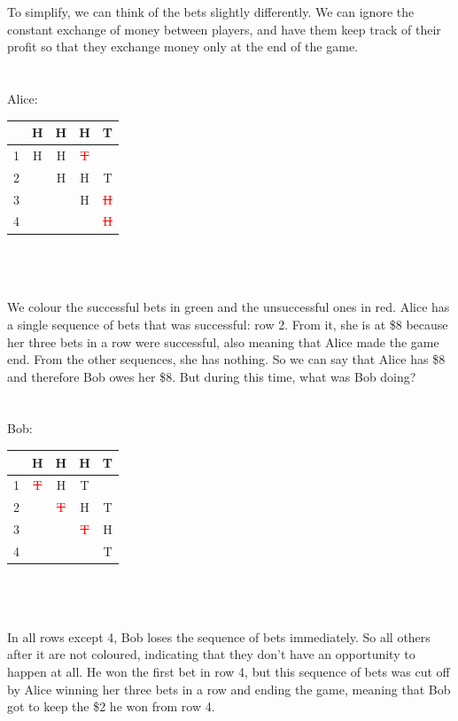 \documentclass[english,12pt,a4paper,final]{article}
\begin{document}
To simplify, we can think of the bets slightly differently. We can ignore the constant exchange of money between players, and have them keep track of their profit so that they exchange money only at the end of the game.
\\\\\\
Alice:
\begin{tabular}{|c|c|c|c|c|}
	\hline
	& H & H & H & T \\
	\hline
	1 & \textcolor{OliveGreen}{H} & \textcolor{OliveGreen}{H} & \textcolor{red}{\sout{T}} &  \\
	\hline
	2 &  & \textcolor{OliveGreen}{H} & \textcolor{OliveGreen}{H} & \textcolor{OliveGreen}{T} \\
	\hline
	3 &  &  & \textcolor{OliveGreen}{H} & \textcolor{red}{\sout{H}} \\
	\hline
	4 &  &  &  & \textcolor{red}{\sout{H}} \\
	\hline
\end{tabular}
\\\\\\
We colour the successful bets in green and the unsuccessful ones in red. Alice has a single sequence of bets that was successful: row 2. From it, she is at \$8 because her three bets in a row were successful, also meaning that Alice made the game end. From the other sequences, she has nothing. So we can say that Alice has \$8 and therefore Bob owes her \$8. But during this time, what was Bob doing?
\\\\\\
Bob:
\begin{tabular}{|c|c|c|c|c|}
	\hline
	& H & H & H & T \\
	\hline
	1 & \textcolor{red}{\sout{T}} & H & T &  \\
	\hline
	2 &  & \textcolor{red}{\sout{T}} & H & T \\
	\hline
	3 &  &  & \textcolor{red}{\sout{T}} & H \\
	\hline
	4 &  &  &  & \textcolor{OliveGreen}{T} \\
	\hline
\end{tabular}
\\\\\\
In all rows except 4, Bob loses the sequence of bets immediately. So all others after it are not coloured, indicating that they don't have an opportunity to happen at all. He won the first bet in row 4, but this sequence of bets was cut off by Alice winning her three bets in a row and ending the game, meaning that Bob got to keep the \$2 he won from row 4.
\end{document}
